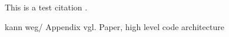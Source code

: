 \documentclass[
    english,
    master,
    ks, %
    bibliography=totoc,
]{webisthesis}
\begin{document}
\begin{frontmatter}

    \tableofcontents





    \end{frontmatter}


    


    This is a test citation \cite{elmanarelbouanani_authorship_2014}.
    
    
     kann weg/ Appendix vgl. Paper, high level code architecture
\end{document}
